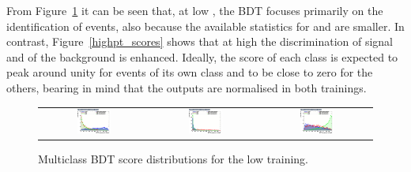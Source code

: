 From Figure~\ref{lowpt_scores} it can be seen that, at low \pth, the BDT focuses primarily on the identification of \ttbar events, also because the available statistics for \ttHtt and \ztautau are smaller. In contrast, Figure~\ref{highpt_scores} shows that at high \pth the discrimination of signal and of the \ztautau background is enhanced. Ideally, the score of each class is expected to peak around unity for events of its own class and to be close to zero for the others, bearing in mind that the outputs are normalised in both trainings.
\begin{figure}[htbp]
  \centering
  \setlength{\tabcolsep}{1.5pt}
  \renewcommand{\arraystretch}{0}
  \begin{tabular}{@{}c c c@{}}
    \includegraphics[width=0.33\textwidth]{images/plots_overtrain_lt200/overtrain_Signal_BDTG.png} &
    \includegraphics[width=0.33\textwidth]{images/plots_overtrain_lt200/overtrain_bkgZ_BDTG.png} &  
    \includegraphics[width=0.33\textwidth]{images/plots_overtrain_lt200/overtrain_bkgtt_BDTG.png}
  \end{tabular}
  \caption{Multiclass BDT score distributions for the low \pth training.}
  \label{lowpt_scores}
\end{figure}

